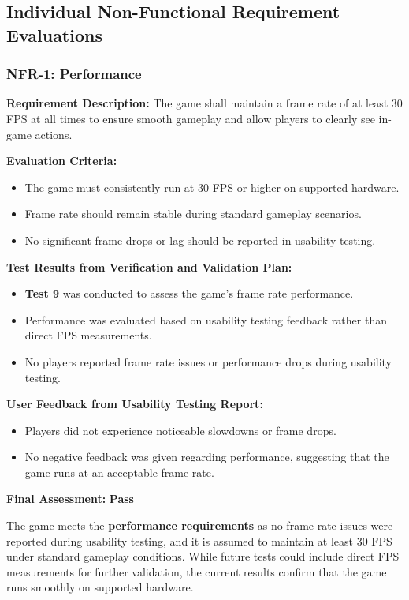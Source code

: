 \documentclass[12pt, titlepage]{article}
\begin{document}
\subsection{Individual Non-Functional Requirement Evaluations}

\subsubsection{NFR-1: Performance}

\textbf{Requirement Description:}  
The game shall maintain a frame rate of at least 30 FPS at all times to ensure smooth gameplay and allow players to clearly see in-game actions.

\textbf{Evaluation Criteria:}  
\begin{itemize}
    \item The game must consistently run at 30 FPS or higher on supported hardware.
    \item Frame rate should remain stable during standard gameplay scenarios.
    \item No significant frame drops or lag should be reported in usability testing.
\end{itemize}

\textbf{Test Results from Verification and Validation Plan:}  
\begin{itemize}
    \item \textbf{Test 9} was conducted to assess the game's frame rate performance.
    \item Performance was evaluated based on usability testing feedback rather than direct FPS measurements.
    \item No players reported frame rate issues or performance drops during usability testing.
\end{itemize}

\textbf{User Feedback from Usability Testing Report:}  
\begin{itemize}
    \item Players did not experience noticeable slowdowns or frame drops.
    \item No negative feedback was given regarding performance, suggesting that the game runs at an acceptable frame rate.
\end{itemize}

\textbf{Final Assessment:} \textbf{Pass}  

The game meets the \textbf{performance requirements} as no frame rate issues were reported during usability testing, and it is assumed to maintain at least 30 FPS under standard gameplay conditions. While future tests could include direct FPS measurements for further validation, the current results confirm that the game runs smoothly on supported hardware.
\end{document}
